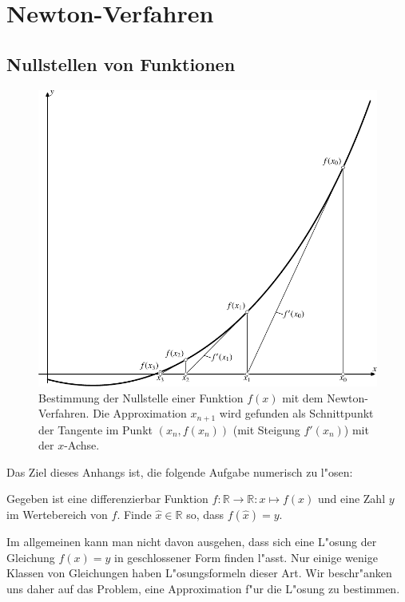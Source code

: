 \chapter{Newton-Verfahren\label{chapter:newton}}
\rhead{}

\section{Nullstellen von Funktionen}
\begin{figure}
\centering
\includegraphics{chapters/images/randwert-2.pdf}
\caption{Bestimmung der Nullstelle einer Funktion $f(x)$ mit dem
Newton-Verfahren.
Die Approximation $x_{n+1}$ wird gefunden als Schnittpunkt der Tangente
im Punkt $(x_n,f(x_n))$ (mit Steigung $f'(x_n)$) mit der $x$-Achse.
\label{newton:graphik}}
\end{figure}
Das Ziel dieses Anhangs ist, die folgende Aufgabe numerisch zu l"osen:
\begin{aufgabe}
Gegeben ist eine differenzierbar Funktion
$f\colon\mathbb R\to\mathbb R:x\mapsto f(x)$
und eine Zahl $y$ im Wertebereich von $f$.
Finde $\hat{x}\in\mathbb R$ so, dass $f(\hat{x})=y$.
\end{aufgabe}
Im allgemeinen kann man nicht davon ausgehen, dass sich eine L"osung der
Gleichung $f(x)=y$ in geschlossener Form finden l"asst.
Nur einige wenige Klassen von Gleichungen haben L"osungsformeln dieser Art.
Wir beschr"anken uns daher auf das Problem, eine Approximation f"ur die
L"osung zu bestimmen.

